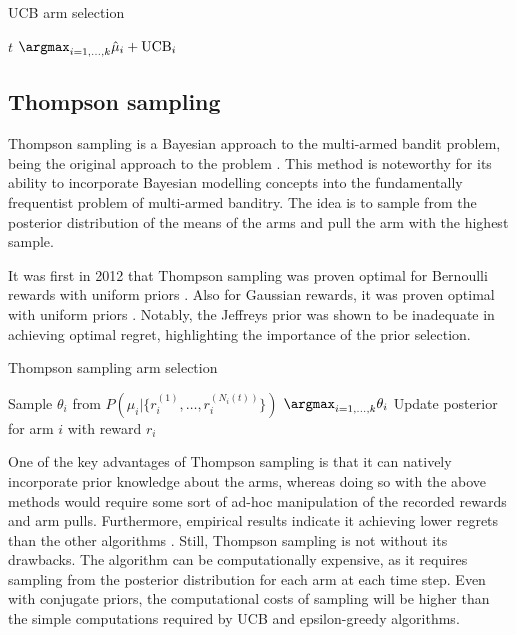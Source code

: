 \begin{algorithm}
    \caption{UCB arm selection}
    \label{alg:ucb}
    \begin{algorithmic}
        \State \Return $t$
        \Else
        \State \Return $\argmax_{i=1,\dots,k} \hat{\mu}_i + \text{UCB}_i$
        \EndIf
    \end{algorithmic}
\end{algorithm}


\subsection{Thompson sampling}
Thompson sampling is a Bayesian approach to the multi-armed bandit problem, being the original approach to the problem \cite{thompson1933}.
This method is noteworthy for its ability to incorporate Bayesian modelling concepts into the fundamentally frequentist problem of multi-armed banditry.
The idea is to sample from the posterior distribution of the means of the arms and pull the arm with the highest sample.

It was first in 2012 that Thompson sampling was proven optimal for Bernoulli rewards with uniform priors \cite{kaufmann2012}.
Also for Gaussian rewards, it was proven optimal with uniform priors \cite{honda2014}.
Notably, the Jeffreys prior was shown to be inadequate in achieving optimal regret, highlighting the importance of the prior selection.

\begin{algorithm}
    \caption{Thompson sampling arm selection}
    \label{alg:thompson}
    \begin{algorithmic}
        \State Sample $\theta_i$ from $P(\mu_i | \{r_i^{(1)}, \dots, r_i^{(N_i(t))}\})$
        \EndFor
        \State \Return $\argmax_{i=1,\dots,k} \theta_i$
        \State Update posterior for arm $i$ with reward $r_i$
    \end{algorithmic}
\end{algorithm}

One of the key advantages of Thompson sampling is that it can natively incorporate prior knowledge about the arms, whereas doing so with the above methods would require some sort of ad-hoc manipulation of the recorded rewards and arm pulls.
Furthermore, empirical results indicate it achieving lower regrets than the other algorithms \cite{kaufmann2012}.
Still, Thompson sampling is not without its drawbacks.
The algorithm can be computationally expensive, as it requires sampling from the posterior distribution for each arm at each time step.
Even with conjugate priors, the computational costs of sampling will be higher than the simple computations required by UCB and epsilon-greedy algorithms.


